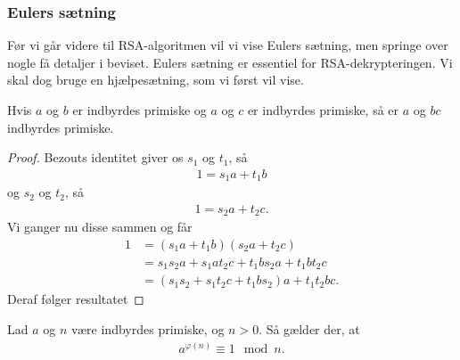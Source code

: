 \documentclass[12pt]{article}
\begin{document}
\subsubsection*{Eulers sætning}
Før vi går videre til RSA-algoritmen vil vi vise Eulers sætning, men springe over nogle få detaljer i beviset. Eulers sætning er essentiel for RSA-dekrypteringen.
Vi skal dog bruge en hjælpesætning, som vi først vil vise.
\begin{lem}\label{lem:coprime}
Hvis $a$ og $b$ er indbyrdes primiske og $a$ og $c$ er indbyrdes primiske, så er $a$ og $bc$ indbyrdes primiske. 
\end{lem}
\begin{proof}
Bezouts identitet giver os $s_1$ og $t_1$, så
\begin{align*}
1 = s_1a+t_1b
\end{align*}
og $s_2$ og $t_2$, så
\begin{align*}
1 = s_2a+t_2c.
\end{align*}
Vi ganger nu disse sammen og får
\begin{align*}
1 &= (s_1a+t_1b)(s_2a+t_2c)\\
  &= s_1s_2a + s_1at_2c + t_1bs_2a + t_1bt_2c\\
  &= (s_1s_2+s_1t_2c+t_1bs_2)a + t_1t_2bc.
\end{align*}
Deraf følger resultatet
\end{proof}
\begin{setn}
Lad $a$ og $n$ være indbyrdes primiske, og $n>0$. Så gælder der, at 
\begin{align*}
a^{\varphi(n)} \equiv 1 \mod{n}.
\end{align*}
\end{setn}
\end{document}
